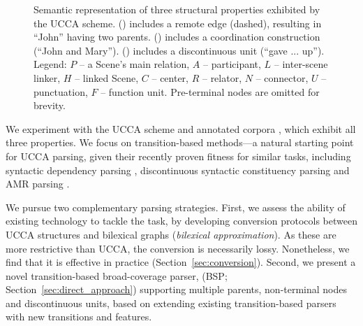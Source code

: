 \documentclass[11pt]{article}
\newcommand{\secref}[1]{Section~\ref{#1}}
\begin{document}
\begin{figure}[t]
\begin{subfigure}[t]{.9\columnwidth}
  \hspace{.25\columnwidth}
  \parbox{.55\columnwidth}{
  }
  \end{subfigure}
  \caption{\label{fig:examples}
    Semantic representation of three structural properties exhibited by the UCCA scheme.
    () includes a remote edge (dashed),
    resulting in ``John'' having two parents. %
    () includes a coordination construction (``John and Mary'').
    () includes a discontinuous unit (``gave ... up'').
    Legend: $P$ -- a Scene's main relation, $A$ -- participant,
    $L$ -- inter-scene linker, $H$ -- linked Scene, $C$ -- center,
    $R$ -- relator, $N$ -- connector, $U$ -- punctuation, $F$ -- function unit.
    Pre-terminal nodes are omitted for brevity.
  }
\end{figure}

We experiment with the UCCA scheme and annotated corpora
\cite[see \secref{sec:ucca}]{abend2013universal},
which exhibit all three properties.
We focus on transition-based methods---a natural starting point for UCCA parsing,
given their recently proven fitness for similar tasks, including syntactic dependency parsing
\cite{dyer2015transition,andor2016globally,kiperwasser2016simple},
discontinuous syntactic constituency parsing
\cite{maier-lichte:2016:DiscoNLP} and AMR parsing
\cite{wang-EtAl:2016:SemEval}.

We pursue two complementary parsing strategies.
First, we assess the ability of existing technology to tackle the task,
by developing conversion protocols between UCCA structures and bilexical graphs
(\emph{bilexical approximation}).
As these are more restrictive than UCCA, the conversion
is necessarily lossy. Nonetheless, we find that it is effective
in practice (\secref{sec:conversion}).
Second, we present a novel transition-based broad-coverage parser,
(BSP; \secref{sec:direct_approach})
supporting multiple parents, non-terminal nodes and discontinuous units,
based on extending existing transition-based parsers
with new transitions and features.
\end{document}

